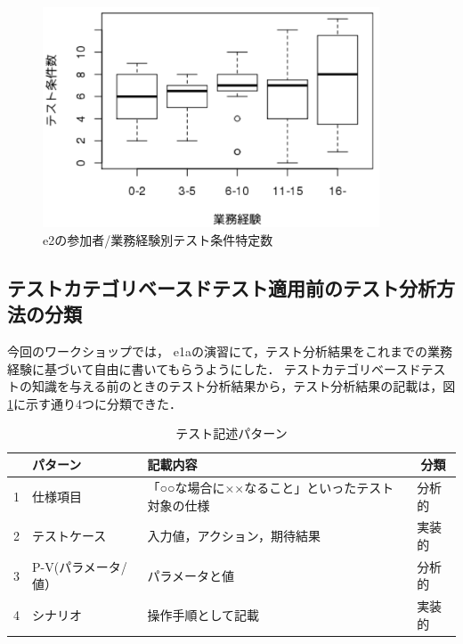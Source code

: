 \begin{figure}[htbp]
  \begin{center}
  \includegraphics[width=10cm]{./image/D-3-Fig16.png}
  \caption{e2の参加者/業務経験別テスト条件特定数}
  \label{fig:D-3-Fig16}
  \end{center}
   \end{figure}


\subsection{テストカテゴリベースドテスト適用前のテスト分析方法の分類}
今回のワークショップでは， e1aの演習にて，テスト分析結果をこれまでの業務経験に基づいて自由に書いてもらうようにした．
テストカテゴリベースドテストの知識を与える前のときのテスト分析結果から，テスト分析結果の記載は，図\ref{tab:D-3-tab11}に示す通り4つに分類できた．
\begin{table}[htbp]

  \centering
  \caption{テスト記述パターン}
    \begin{tabular}{|c|p{9em}|p{14em}|p{3em}|}
    \hline
          & パターン & 記載内容 & \multicolumn{1}{c|}{分類} \bigstrut\\
    \hline
    \hline
    1     & 仕様項目  & 「○○な場合に××なること」といったテスト対象の仕様 & 分析的 \bigstrut\\
    \hline
    2     & テストケース & 入力値，アクション，期待結果 & 実装的 \bigstrut\\
    \hline
    3     & P-V(パラメータ/値） & パラメータと値 & 分析的 \bigstrut[t]\\
    \hline
    4     & シナリオ  & 操作手順として記載 & 実装的 \bigstrut[b]\\
    \hline
    \end{tabular}%
  \label{tab:D-3-tab11}%
\end{table}%

